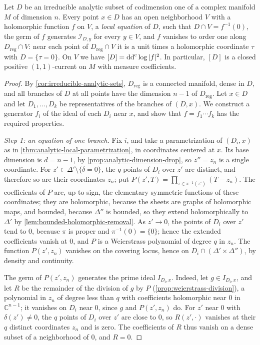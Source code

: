 \begin{lemma}\label{lem:irreducible-hypersurface-equation}
Let $D$ be an irreducible analytic subset of codimension one of a complex manifold $M$ of dimension $n$. Every point $x\in D$ has an open neighborhood $V$ with a holomorphic function $f$ on $V$, a \emph{local equation} of $D$, such that $D\cap V=f^{-1}(0)$, the germ of $f$ generates $\mathcal I_{D,y}$ for every $y\in V$, and $f$ vanishes to order one along $D_{\mathrm{reg}}\cap V$: near each point of $D_{\mathrm{reg}}\cap V$ it is a unit times a holomorphic coordinate $\tau$ with $D=\{\tau=0\}$. On $V$ we have $[D]=\mathrm{dd}^{\mathrm{c}}\log|f|^2$. In particular, $[D]$ is a closed positive $(1,1)$-current on $M$ with measure coefficients.
\end{lemma}
\begin{proof}
By \cref{cor:irreducible-analytic-sets}, $D_{\mathrm{reg}}$ is a connected manifold, dense in $D$, and all branches of $D$ at all points have the dimension $n-1$ of $D_{\mathrm{reg}}$. Let $x\in D$ and let $D_1,\ldots,D_k$ be representatives of the branches of $(D,x)$. We construct a generator $f_i$ of the ideal of each $D_i$ near $x$, and show that $f=f_1\cdots f_k$ has the required properties.

\emph{Step 1: an equation of one branch.} Fix $i$, and take a parametrization of $(D_i,x)$ as in \cref{thm:analytic-local-parametrization}, in coordinates centered at $x$. Its base dimension is $d=n-1$, by \cref{prop:analytic-dimension-drop}, so $z''=z_n$ is a single coordinate. For $z'\in\Delta'\setminus\{\delta=0\}$, the $q$ points of $D_i$ over $z'$ are distinct, and therefore so are their coordinates $z_n$; put $P(z',T)=\prod_{z\in\pi^{-1}(z')}(T-z_n)$. The coefficients of $P$ are, up to sign, the elementary symmetric functions of these coordinates; they are holomorphic, because the sheets are graphs of holomorphic maps, and bounded, because $\Delta''$ is bounded, so they extend holomorphically to $\Delta'$ by \cref{lem:bounded-holomorphic-removal}. As $z'\to0$, the points of $D_i$ over $z'$ tend to $0$, because $\pi$ is proper and $\pi^{-1}(0)=\{0\}$; hence the extended coefficients vanish at $0$, and $P$ is a Weierstrass polynomial of degree $q$ in $z_n$. The function $P(z',z_n)$ vanishes on the covering locus, hence on $D_i\cap(\Delta'\times\Delta'')$, by density and continuity.

The germ of $P(z',z_n)$ generates the prime ideal $I_{D_i,x}$. Indeed, let $g\in I_{D_i,x}$, and let $R$ be the remainder of the division of $g$ by $P$ (\cref{prop:weierstrass-division}), a polynomial in $z_n$ of degree less than $q$ with coefficients holomorphic near $0$ in $\mathbb C^{n-1}$; it vanishes on $D_i$ near $0$, since $g$ and $P(z',z_n)$ do. For $z'$ near $0$ with $\delta(z')\neq0$, the $q$ points of $D_i$ over $z'$ are close to $0$, so $R(z',\cdot)$ vanishes at their $q$ distinct coordinates $z_n$ and is zero. The coefficients of $R$ thus vanish on a dense subset of a neighborhood of $0$, and $R=0$.


\end{proof}
